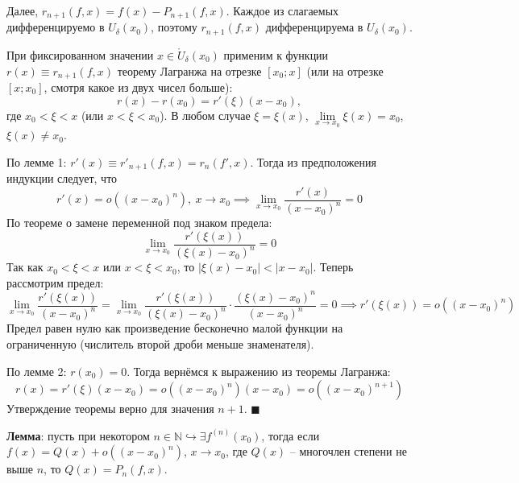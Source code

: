 \documentclass[12pt, a4paper, reqno]{article}
\begin{document}
    Далее, $r_{n + 1}(f, x) = f(x) - P_{n + 1}(f, x)$. Каждое из слагаемых дифференцируемо в
    $U_{\delta}(x_0)$, поэтому $r_{n + 1}(f, x)$ дифференцируема в $U_{\delta}(x_0)$.

    При фиксированном значении $x\in\mathring U_{\delta}(x_0)$ применим к функции $r(x) \equiv
    r_{n + 1}(f, x)$ теорему Лагранжа на отрезке $[x_0; x]$ (или на отрезке $[x; x_0]$, смотря какое
    из двух чисел больше):
    \begin{equation*}
        r(x) - r(x_0) = r'(\xi)(x - x_0),
    \end{equation*}
    где $x_0 < \xi < x$ (или $x < \xi < x_0$). В любом случае $\xi = \xi(x)$,
    $\lim\limits_{x\to x_0} \xi(x) = x_0$, $\xi(x)\neq x_0$.

    По лемме 1: $r'(x) \equiv r'_{n + 1}(f, x) = r_{n}(f', x)$. Тогда из предположения индукции
    следует, что
    \begin{equation*}
        r'(x) = o((x - x_0)^n),\ x\to x_0 \implies \lim\limits_{x\to x_0} \dfrac{r'(x)}{(x - x_0)^n} = 0
    \end{equation*}
    По теореме о замене переменной под знаком предела:
    \begin{equation*}
        \lim\limits_{x\to x_0} \dfrac{r'(\xi(x))}{(\xi(x) - x_0)^n} = 0
    \end{equation*}
    Так как $x_0 < \xi < x$ или $x < \xi < x_0$, то $|\xi(x) - x_0| < |x - x_0|$. Теперь рассмотрим
    предел:
    \begin{equation*}
        \lim\limits_{x\to x_0} \dfrac{r'(\xi(x))}{(x - x_0)^n} =
        \lim\limits_{x\to x_0}\dfrac{r'(\xi(x))}{(\xi(x) - x_0)^n}\cdot
        \dfrac{(\xi(x) - x_0)^n}{(x - x_0)^n} = 0 \implies r'(\xi(x)) = o((x - x_0)^n)
    \end{equation*}
    Предел равен нулю как произведение бесконечно малой функции на ограниченную (числитель второй
    дроби меньше знаменателя).

    По лемме 2: $r(x_0) = 0$. Тогда вернёмся к выражению из теоремы Лагранжа:
    \begin{equation*}
        r(x) = r'(\xi)(x - x_0) = o((x - x_0)^n)(x - x_0) = o((x - x_0)^{n + 1})
    \end{equation*}
    Утверждение теоремы верно для значения $n + 1$. $\blacksquare$

    \textbf{Лемма}: пусть при некотором $n\in\mathbb{N}\hookrightarrow\exists f^{(n)}(x_0)$, тогда
    если $f(x) = Q(x) + o((x - x_0)^n)$, $x\to x_0$, где $Q(x)$ -- многочлен степени не выше $n$,
    то $Q(x) = P_n(f, x)$.
\end{document}
